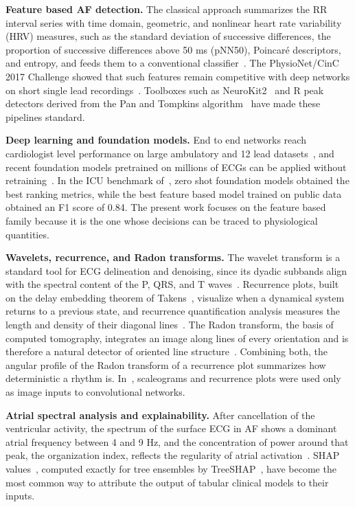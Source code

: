 \documentclass[conference,a4paper]{IEEEtran}
\begin{document}
\noindent\textbf{Feature based AF detection.} The classical approach summarizes the RR interval series with time domain, geometric, and nonlinear heart rate variability (HRV) measures, such as the standard deviation of successive differences, the proportion of successive differences above 50 ms (pNN50), Poincaré descriptors, and entropy, and feeds them to a conventional classifier~\cite{andreotti2017,jahan2022}. The PhysioNet/CinC 2017 Challenge showed that such features remain competitive with deep networks on short single lead recordings~\cite{clifford2017}. Toolboxes such as NeuroKit2~\cite{makowski2021} and R peak detectors derived from the Pan and Tompkins algorithm~\cite{pan1985,sleepecg} have made these pipelines standard.

\noindent\textbf{Deep learning and foundation models.} End to end networks reach cardiologist level performance on large ambulatory and 12 lead datasets~\cite{hannun2019,ribeiro2020}, and recent foundation models pretrained on millions of ECGs can be applied without retraining~\cite{mckeen2025,li2025}. In the ICU benchmark of~\cite{nassar2025}, zero shot foundation models obtained the best ranking metrics, while the best feature based model trained on public data obtained an F1 score of 0.84. The present work focuses on the feature based family because it is the one whose decisions can be traced to physiological quantities.

\noindent\textbf{Wavelets, recurrence, and Radon transforms.} The wavelet transform is a standard tool for ECG delineation and denoising, since its dyadic subbands align with the spectral content of the P, QRS, and T waves~\cite{addison2005,mallat2009}. Recurrence plots, built on the delay embedding theorem of Takens~\cite{takens1981}, visualize when a dynamical system returns to a previous state, and recurrence quantification analysis measures the length and density of their diagonal lines~\cite{marwan2007}. The Radon transform, the basis of computed tomography, integrates an image along lines of every orientation and is therefore a natural detector of oriented line structure~\cite{deans1983}. Combining both, the angular profile of the Radon transform of a recurrence plot summarizes how deterministic a rhythm is. In~\cite{nassar2025}, scaleograms and recurrence plots were used only as image inputs to convolutional networks.

\noindent\textbf{Atrial spectral analysis and explainability.} After cancellation of the ventricular activity, the spectrum of the surface ECG in AF shows a dominant atrial frequency between 4 and 9 Hz, and the concentration of power around that peak, the organization index, reflects the regularity of atrial activation~\cite{stridh2001,bollmann2006}. SHAP values~\cite{lundberg2017}, computed exactly for tree ensembles by TreeSHAP~\cite{lundberg2020}, have become the most common way to attribute the output of tabular clinical models to their inputs.
\end{document}
